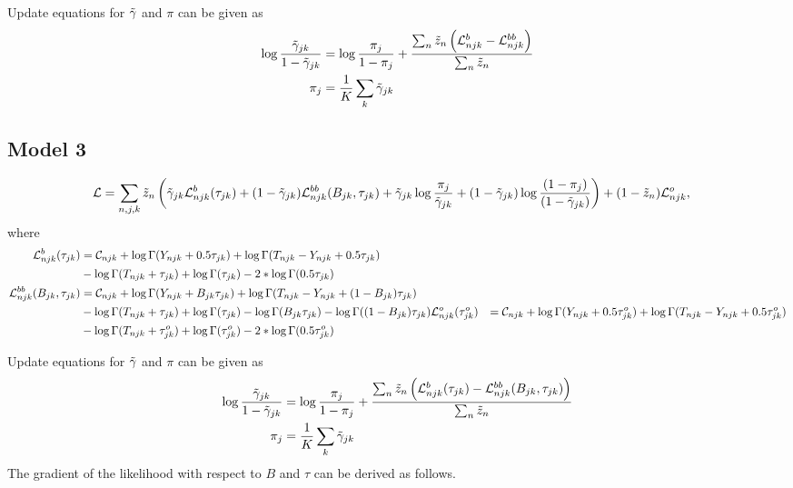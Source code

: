 \documentclass[reqno]{amsart}
\numberwithin{equation}{section}
\begin{document}
Update equations for $\tilde{\gamma}$ and $\pi$ can be given as
\begin{align}
    \log \frac{\tilde{\gamma}_{jk}}{1-\tilde{\gamma}_{jk}}
        &= \log \frac{\pi_j}{1-\pi_j} + \frac{\sum_n \tilde{z}_n \left( \mathcal{L}^b_{njk} - \mathcal{L}^{bb}_{njk} \right)}{\sum_n \tilde{z}_n} \\
    \pi_j
        &= \frac{1}{K} \sum_k \tilde{\gamma}_{jk}
\end{align}

\subsection{Model 3}
\begin{align}
    \mathcal{L}
        &= \sum_{n,j,k} \tilde{z}_n \left( \tilde{\gamma}_{jk} \mathcal{L}^b_{njk}(\tau_{jk}) 
        + (1-\tilde{\gamma}_{jk}) \mathcal{L}^{bb}_{njk}(B_{jk},\tau_{jk})
        + \tilde{\gamma}_{jk} \log \frac{\pi_j}{\tilde{\gamma}_{jk}} + (1-\tilde{\gamma}_{jk}) \log \frac{(1-\pi_j)}{(1-\tilde{\gamma}_{jk})} \right)
        + (1-\tilde{z}_n) \mathcal{L}^o_{njk},
\end{align}
where
\begin{align}
    \mathcal{L}^b_{njk}(\tau_{jk})
        &= \mathcal{C}_{njk} + \log \Gamma(Y_{njk}+0.5\tau_{jk}) + \log \Gamma(T_{njk}-Y_{njk}+0.5\tau_{jk}) \notag\\
        &- \log \Gamma(T_{njk}+\tau_{jk}) + \log \Gamma(\tau_{jk}) - 2*\log \Gamma(0.5\tau_{jk}) \\
    \mathcal{L}^{bb}_{njk}(B_{jk},\tau_{jk})
        &= \mathcal{C}_{njk} + \log \Gamma(Y_{njk}+B_{jk}\tau_{jk}) + \log \Gamma(T_{njk}-Y_{njk}+(1-B_{jk})\tau_{jk}) \notag\\
        &- \log \Gamma(T_{njk}+\tau_{jk}) + \log \Gamma(\tau_{jk}) - \log \Gamma(B_{jk}\tau_{jk}) - \log \Gamma((1-B_{jk})\tau_{jk})
    \mathcal{L}^o_{njk}(\tau^o_{jk})
        &= \mathcal{C}_{njk} + \log \Gamma(Y_{njk}+0.5\tau^o_{jk}) + \log \Gamma(T_{njk}-Y_{njk}+0.5\tau^o_{jk}) \notag\\
        &- \log \Gamma(T_{njk}+\tau^o_{jk}) + \log \Gamma(\tau^o_{jk}) - 2*\log \Gamma(0.5\tau^o_{jk}) \\
\end{align}

Update equations for $\tilde{\gamma}$ and $\pi$ can be given as
\begin{align}
    \log \frac{\tilde{\gamma}_{jk}}{1-\tilde{\gamma}_{jk}}
        &= \log \frac{\pi_j}{1-\pi_j} + \frac{\sum_n \tilde{z}_n \left( \mathcal{L}^b_{njk}(\tau_{jk}) 
        - \mathcal{L}^{bb}_{njk}(B_{jk},\tau_{jk}) \right)}{\sum_n \tilde{z}_n} \\
    \pi_j
        &= \frac{1}{K} \sum_k \tilde{\gamma}_{jk}
\end{align}
The gradient of the likelihood with respect to $B$ and $\tau$ can be derived as follows.
\end{document}
